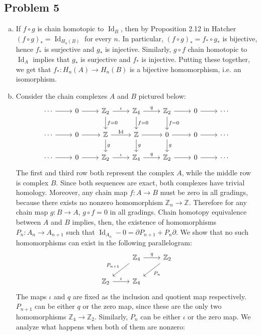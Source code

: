 \documentclass[12 pt]{article}
\newcommand{\Z}{\mathbb{Z}}
\newcommand{\p}{\partial}
\DeclareMathOperator{\id}{Id}
\begin{document}
\subsection*{Problem 5}
\begin{enumerate}[(a)]
\item If $f\circ g$ is chain homotopic to $\id_B$, then by Proposition 2.12 in Hatcher $(f\circ g)_* = 
\id_{H_n(B)}$ for every $n$. In particular, $(f\circ g)_* = f_* \circ g_*$ is bijective, hence $f_*$ is
surjective and $g_*$ is injective. Similarly, $g \circ f$ chain homotopic to $\id_A$ implies that $g_*$ is
surjective and $f_*$ is injective. Putting these together, we get that $f_* : H_n(A) \to H_n(B)$ is a bijective
homomorphism, i.e. an isomorphism.
\item Consider the chain complexes $A$ and $B$ pictured below:
\[
\begin{tikzcd}
\cdots\arrow{r}&0\arrow{r}&\Z_2\arrow{r}{\iota}\arrow{d}{f=0}&\Z_4\arrow{r}{q}\arrow{d}{f=0}&
\Z_2\arrow{r}\arrow{d}{f=0}&0\arrow{r}&\cdots \\
\cdots\arrow{r} & 0\arrow{r} & \Z\arrow{r}{\id}\arrow{d}{g} & \Z\arrow{r}\arrow{d}{g} & 
0\arrow{r}\arrow{d}{g} & 0\arrow{r} & \cdots \\
\cdots\arrow{r}&0\arrow{r}&\Z_2\arrow{r}{\iota}&\Z_4\arrow{r}{q}&\Z_2\arrow{r}&0\arrow{r}&\cdots
\end{tikzcd}
\]
The first and third row both represent the complex $A$, while the middle row is complex $B$. Since both sequences 
are exact, both complexes have trivial homology. Moreover, any chain map $f : A \to B$ must be zero in all
gradings, because there exists no nonzero homomorphism $\Z_n \to \Z$. Therefore for any chain map $g:
B \to A$, $g\circ f = 0$ in all gradings. Chain homotopy equivalence between $A$ and $B$ implies, then, the
existence of homomorphisms $P_n : A_n \to A_{n+1}$ such that $\id_{A_n} - 0 = \p P_{n+1} + P_n \p$. We show
that no such homomorphisms can exist in the following parallelogram:
\[
\begin{tikzcd}
{} & \Z_4\arrow{r}{q}\arrow[swap]{ld}{P_{n+1}} & \Z_2\arrow{ld}{P_n} \\
\Z_2\arrow{r}{\iota} & \Z_4 & 
\end{tikzcd}
\]
The maps $\iota$ and $q$ are fixed as the inclusion and quotient map respectively. $P_{n+1}$ can be either $q$
or the zero map, since these are the only two homomorphisms $\Z_4 \to \Z_2$. Similarly, $P_n$ can be either
$\iota$ or the zero map. We analyze what happens when both of them are nonzero:
\begin{align*}

\end{align*}
\end{enumerate}
\end{document}
